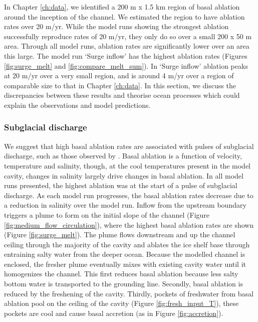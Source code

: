 In Chapter \ref{ch:data}, we identified a 200 m x 1.5 km region of basal ablation around the inception of the channel. We estimated the region to have ablation rates over 20 m/yr. 
While the model runs showing the strongest ablation successfully reproduce rates of 20 m/yr, they only do so over a small 200 x 50 m area. Through all model runs, ablation rates are significantly lower over an area this large. The model run `Surge inflow' has the highest ablation rates (Figures \ref{fig:surge_melt} and \ref{fig:compare_melt_sum}). In `Surge inflow' ablation peaks at 20 m/yr over a very small region, and is around 4 m/yr over a region of comparable size to that in Chapter \ref{ch:data}. In this section, we discuss the discrepancies between these results and theorise ocean processes which could explain the observations and model predictions.

\subsubsection{Subglacial discharge} \label{sec:ocean_pulse}
We suggest that high basal ablation rates are associated with pulses of subglacial discharge, such as those observed by \cite{kim2016active}.  Basal ablation is a function of velocity, temperature and salinity, though, at the cool temperatures present in the model cavity, changes in salinity largely drive changes in basal ablation.  
In all model runs presented, the highest ablation was at the start of a pulse of subglacial discharge. As each model run progresses, the basal ablation rates decrease due to a reduction in salinity over the model run. 
Inflow from the upstream boundary triggers a plume to form on the initial slope of the channel (Figure \ref{fig:medium_flow_circulation}), where the highest basal ablation rates are shown (Figure \ref{fig:surge_melt}). The plume flows downstream and up the channel ceiling through the majority of the cavity and ablates the ice shelf base through entraining salty water from the deeper ocean. Because the modelled channel is enclosed, the fresher plume eventually mixes with existing cavity water until it homogenizes the channel. This first reduces basal ablation because less salty bottom water is transported to the grounding line. Secondly, basal ablation is reduced by the freshening of the cavity.  Thirdly, pockets of freshwater from basal ablation pool on the ceiling of the cavity (Figure \ref{fig:fresh_input_T}), these pockets are cool and cause basal accretion (as in Figure \ref{fig:accretion}).

